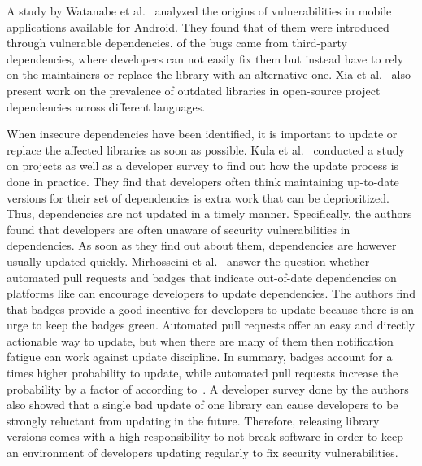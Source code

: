 A study by Watanabe et al.~\cite{watanabe2017} analyzed the origins of vulnerabilities in mobile applications available
for Android.
They found that  of them were introduced through vulnerable dependencies.
 of the bugs came from third-party dependencies, where developers can not easily fix them but instead
have to rely on the maintainers or replace the library with an alternative one.
Xia et al.~\cite{xia2014} also present work on the prevalence of outdated libraries in open-source project
dependencies across different languages.

When insecure dependencies have been identified, it is important to update or replace the affected libraries as soon as
possible.
Kula et al.~\cite{kula2017} conducted a study on \github{} projects as well as a developer survey to find out how the
update process is done in practice.
They find that developers often think maintaining up-to-date versions for their set of dependencies is extra work that
can be deprioritized.
Thus, dependencies are not updated in a timely manner.
Specifically, the authors found that developers are often unaware of security vulnerabilities in dependencies.
As soon as they find out about them, dependencies are however usually updated quickly.
Mirhosseini et al.~\cite{mirhosseini2017} answer the question whether automated pull requests and badges that indicate
out-of-date dependencies on platforms like \github{} can encourage developers to update dependencies.
The authors find that badges provide a good incentive for developers to update because there is an urge to keep the
badges green.
Automated pull requests offer an easy and directly actionable way to update, but when there are many of them then
notification fatigue can work against update discipline.
In summary, badges account for a  times higher probability to update, while automated pull requests
increase the probability by a factor of  according to~\cite{mirhosseini2017}.
A developer survey done by the authors also showed that a single bad update of one library can cause developers to be
strongly reluctant from updating in the future.
Therefore, releasing library versions comes with a high responsibility to not break software in order to keep an
environment of developers updating regularly to fix security vulnerabilities.
